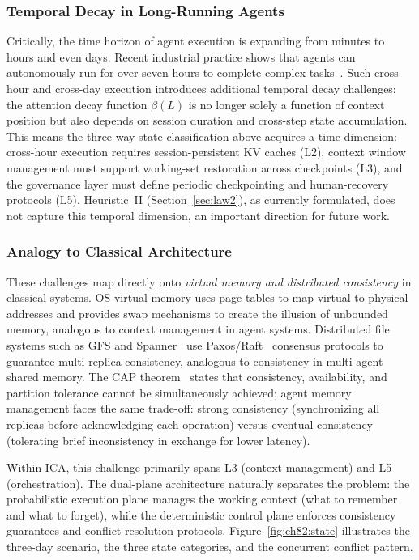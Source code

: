 \subsubsection{Temporal Decay in Long-Running Agents}
Critically, the time horizon of agent execution is expanding from minutes to hours and even days.
Recent industrial practice shows that agents can autonomously run for over seven hours to complete complex tasks~\cite{anthropic2026agenticreport}.
Such cross-hour and cross-day execution introduces additional temporal decay challenges: the attention decay function $\beta(L)$ is no longer solely a function of context position but also depends on session duration and cross-step state accumulation.
This means the three-way state classification above acquires a time dimension: cross-hour execution requires session-persistent KV caches (L2), context window management must support working-set restoration across checkpoints (L3), and the governance layer must define periodic checkpointing and human-recovery protocols (L5).
Heuristic~II (Section~\ref{sec:law2}), as currently formulated, does not capture this temporal dimension, an important direction for future work.

\subsubsection{Analogy to Classical Architecture}
These challenges map directly onto \emph{virtual memory and distributed consistency} in classical systems.
OS virtual memory uses page tables to map virtual to physical addresses and provides swap mechanisms to create the illusion of unbounded memory, analogous to context management in agent systems.
Distributed file systems such as GFS and Spanner~\cite{spanner2012} use Paxos/Raft~\cite{raft2014} consensus protocols to guarantee multi-replica consistency, analogous to consistency in multi-agent shared memory.
The CAP theorem~\cite{cap2002} states that consistency, availability, and partition tolerance cannot be simultaneously achieved; agent memory management faces the same trade-off: strong consistency (synchronizing all replicas before acknowledging each operation) versus eventual consistency (tolerating brief inconsistency in exchange for lower latency).

Within ICA, this challenge primarily spans L3 (context management) and L5 (orchestration).
The dual-plane architecture naturally separates the problem: the probabilistic execution plane manages the working context (what to remember and what to forget), while the deterministic control plane enforces consistency guarantees and conflict-resolution protocols.
Figure~\ref{fig:ch82:state} illustrates the three-day scenario, the three state categories, and the concurrent conflict pattern.

